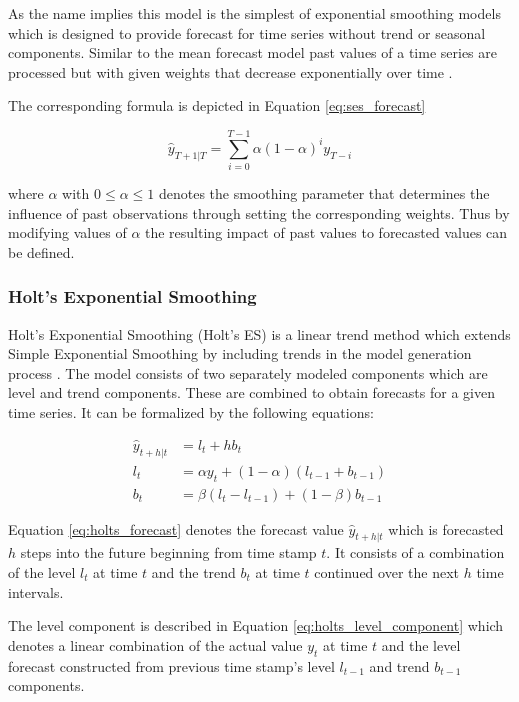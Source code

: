 As the name implies this model is the simplest of exponential smoothing models which is designed to provide forecast for time series without trend or seasonal components. Similar to the mean forecast model past values of a time series are processed but with given weights that decrease exponentially over time \cite{hyndman2012forecasting,weron2007modeling}. 

The corresponding formula is depicted in Equation \ref{eq:ses_forecast} 

\begin{equation}
\hat{y}_{T+1|T} = \sum_{i=0}^{T-1} \alpha (1 - \alpha)^i y_{T-i}
\label{eq:ses_forecast}
\end{equation}

where $\alpha$ with $0 \le \alpha \le 1$ denotes the smoothing parameter that determines the influence of past observations through setting the corresponding weights. Thus by modifying values of $\alpha$ the resulting impact of past values to forecasted values can be defined. 

\subsubsection{Holt's Exponential Smoothing}

Holt's Exponential Smoothing (Holt's ES) is a linear trend method which extends Simple Exponential Smoothing by including trends in the model generation process \cite{hyndman2012forecasting}. The model consists of two separately modeled components which are level and trend components. These are combined to obtain forecasts for a given time series. It can be formalized by the following equations:

\begin{align}
 \hat{y}_{t+h|t} &= l_t + h b_t \label{eq:holts_forecast} \\
 l_t &= \alpha y_t + (1 - \alpha) (l_{t-1} + b_{t-1})\label{eq:holts_level_component} \\
 b_t &= \beta (l_t - l_{t-1}) + (1 - \beta) b_{t-1}\label{eq:holts_trend_component}
\end{align}

Equation \ref{eq:holts_forecast} denotes the forecast value $\hat{y}_{t+h|t}$ which is forecasted $h$ steps into the future beginning from time stamp $t$. It consists of a combination of the level $l_t$ at time $t$ and the trend $b_t$ at time $t$ continued over the next $h$ time intervals. 

The level component is described in Equation \ref{eq:holts_level_component} which denotes a linear combination of the actual value $y_t$ at time $t$ and the level forecast constructed from previous time stamp's level $l_{t-1}$ and trend $b_{t-1}$ components. 

